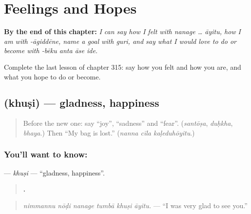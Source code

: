 
\chapter{Feelings and Hopes}
\label{ch:ka-feelings-and-hopes}

\begin{chapteropening}
\textbf{By the end of this chapter:} \emph{I can say how I felt with nanage … āyitu, how I am with -āgiddēne, name a goal with guri, and say what I would love to do or become with -bēku anta āse ide.}

Complete the last lesson of chapter 315: say how you felt and how you are, and what you hope to do or become.
\end{chapteropening}

\section[\texorpdfstring{\kn{ಖುಷಿ} (khuṣi)}{ಖುಷಿ (khuṣi)}]{ (khuṣi) — gladness, happiness}

\label{lesson:KA-C315-khusi}



\begin{quote}
Before the new one: say \textquotedblleft{}joy\textquotedblright{}, \textquotedblleft{}sadness\textquotedblright{} and \textquotedblleft{}fear\textquotedblright{}. (\emph{santōṣa}, \emph{duḥkha}, \emph{bhaya}.) Then \textquotedblleft{}My bag is lost.\textquotedblright{} (\emph{nanna cīla kaḷeduhōyitu}.)
\end{quote}

\subsection*{You'll want to know: }
\textbf{} — \emph{khuṣi} — \textquotedblleft{}gladness, happiness\textquotedblright{}.

\begin{quote}
\textbf{     .}
\end{quote}

\begin{quote}
\emph{nimmannu nōḍi nanage tumbā khuṣi āyitu.} — \textquotedblleft{}I was very glad to see you.\textquotedblright{}
\end{quote}

